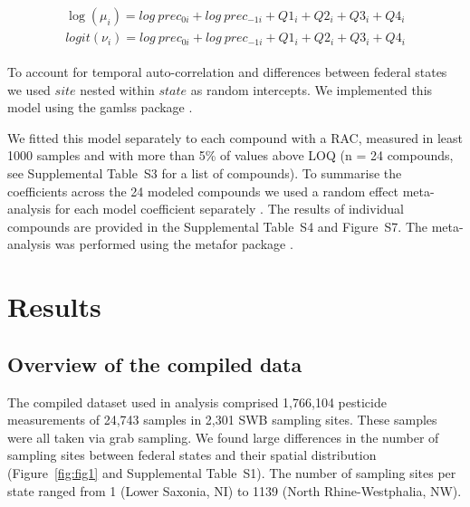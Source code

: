 \documentclass[journal=esthag,manuscript=article]{achemso}
\begin{document}
\begin{align}
\begin{split}
\log(\mu_{i}) = log~prec_{0 i} + log~prec_{-1 i} + Q1_{i} + Q2_{i}+Q3_{i}+Q4_{i}\\
logit(\nu_{i}) = log~prec_{0 i} + log~prec_{-1 i} + Q1_{i} + Q2_{i}+Q3_{i}+Q4_{i}
\end{split}
\label{eqn:eqn4}
\end{align}

To account for temporal auto-correlation and differences between federal states we used $site$ nested within $state$ as random intercepts.
We implemented this model using the gamlss package \cite{stasinopoulos_generalized_2007}.

We fitted this model separately to each compound with a RAC, measured in least 1000 samples and with more than 5\% of values above LOQ (n = 24 compounds, see Supplemental Table~S3 for a list of compounds). 
To summarise the coefficients across the 24 modeled compounds we used a random effect meta-analysis for each model coefficient separately \citep{harrison_getting_2011}. 
The results of individual compounds are provided in the Supplemental Table~S4 and Figure~S7.
The meta-analysis was performed using the metafor package \citep{Viechtbauer_2010}. 



\section{Results}
\subsection{Overview of the compiled data}

The compiled dataset used in analysis comprised 1,766,104 pesticide measurements of 24,743 samples in 2,301 SWB sampling sites.  %
These samples were all taken via grab sampling.  
We found large differences in the number of sampling sites between federal states and their spatial distribution (Figure~\ref{fig:fig1} and Supplemental Table~S1). 
The number of sampling sites per state ranged from 1 (Lower Saxonia, NI) to 1139 (North Rhine-Westphalia, NW). 
\end{document}
